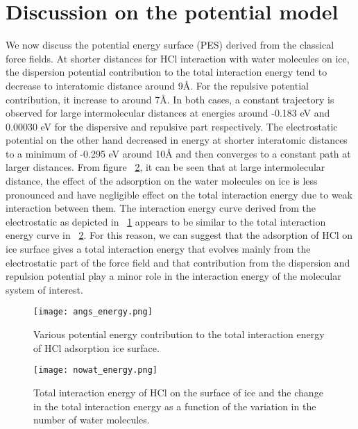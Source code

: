 \documentclass[a4paper,11pt]{report}
\begin{document}
\section{Discussion on the potential model}
We now discuss the potential energy surface (PES) derived from the classical force fields. At shorter distances for HCl interaction with water molecules on ice, the dispersion potential contribution to the total interaction energy tend to decrease to interatomic distance around 9{{\AA}}. For the repulsive potential contribution, it increase to around 7{{\AA}}. In both cases, a constant trajectory is observed for large intermolecular distances at energies around -0.183 eV and 0.00030 eV for the dispersive and repulsive part respectively. The electrostatic potential on the other hand decreased in energy at shorter interatomic distances to a minimum of -0.295 eV around 10{{\AA}} and then converges to a constant path at larger distances. From figure ~\ref{figure12}, it can be seen that at large intermolecular distance, the effect of the adsorption on the water molecules on ice is less pronounced and have negligible effect on the total interaction energy due to weak interaction between them. The interaction energy curve derived from the electrostatic as depicted in ~\ref{figure6} appears to be similar to the total interaction energy curve in ~\ref{figure12}. For this reason, we can suggest that the adsorption of HCl on ice surface gives a total interaction energy that evolves mainly from the electrostatic part of the force field and that contribution from the dispersion and repulsion potential play a minor role in the interaction energy of the molecular system of interest.

\begin{figure}[H]\large
\texttt{[image: angs\_energy.png]}
\caption{Various potential energy contribution to the total interaction energy of HCl adsorption ice surface.}
\label{figure6}
\end{figure}

\begin{figure}[H]\large
\texttt{[image: nowat\_energy.png]}
\caption{Total interaction energy of HCl on the surface of ice and the change in the total interaction energy as a function of the variation in the number of water molecules.}
\label{figure12}
\end{figure}
\end{document}
